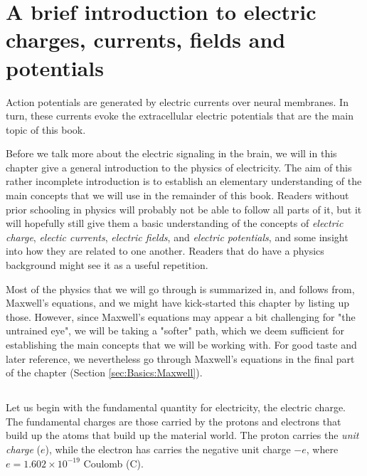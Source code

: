 \section{A brief introduction to electric charges, currents, fields and potentials} 
\label{sec:Basics}
Action potentials are generated by electric currents over neural membranes. In turn, these currents
evoke the extracellular electric potentials that are the main topic of this book. 

Before we talk more about the electric signaling in the brain, we will in this chapter give a general introduction to the physics of electricity. The aim of this rather incomplete introduction is to establish an elementary understanding of the main concepts that we will use in the remainder of this book. Readers without prior schooling in physics will probably not be able to follow all parts of it, but it will hopefully still give them a basic understanding of the concepts of \textit{electric charge}, \textit{electic currents}, \textit{electric fields}, and \textit{electric potentials}, and some insight into how they are related to one another. Readers that do have a physics background might see it as a useful repetition. 

Most of the physics that we will go through is summarized in, and follows from, Maxwell's equations, and we might have kick-started this chapter by listing up those. However, since Maxwell's equations may appear a bit challenging for "the untrained eye", we will be taking a "softer" path, which we deem sufficient for establishing the main concepts that we will be working with. For good taste and later reference, we nevertheless go through Maxwell's equations in the final part of the chapter (Section \ref{sec:Basics:Maxwell}).


\subsection{}
\label{Sec:Basics:Charge} 
Let us begin with the fundamental quantity for electricity, the electric charge. The fundamental charges are those carried by the protons and electrons that build up the atoms that build up the material world. The proton carries the \textit{unit charge} ($e$), while the electron has carries the negative unit charge $-e$, where $e = 1.602\times10^{-19}$ Coulomb (C). 

